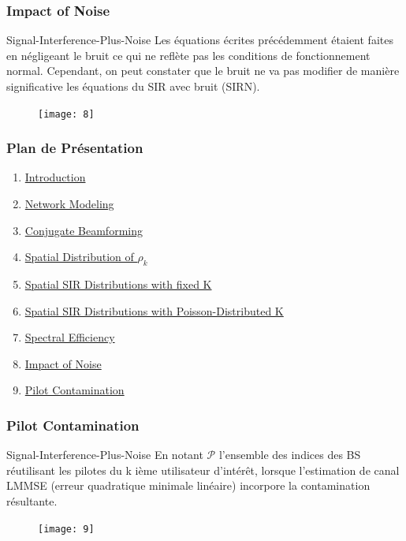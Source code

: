 \documentclass[pdf]{beamer}
\begin{document}
\begin{frame}[label=impactOfNoise]
\frametitle{Impact of Noise}
\begin{exampleblock}{Signal-Interference-Plus-Noise}
Les équations écrites précédemment étaient faites en négligeant le bruit ce qui ne reflète pas les conditions de fonctionnement normal. Cependant, on peut constater que le bruit ne va pas modifier de manière significative les équations du SIR avec bruit (SIRN).
\begin{figure}
	\texttt{[image: 8]}
\end{figure}
\end{exampleblock}
\end{frame}

\begin{frame}
\frametitle{Plan de Présentation }
\begin{enumerate}
	\item \hyperlink{Introduction}{Introduction}
	\item \hyperlink{networkModeling}{Network Modeling}
	\item \hyperlink{conjugateBeamforming}{Conjugate Beamforming}
	\item \hyperlink{spatialDistribution}{Spatial Distribution of $\rho_k$}
	\item \hyperlink{spatialsir}{Spatial SIR Distributions with fixed K}
	\item \hyperlink{spatialsirk}{Spatial SIR Distributions with Poisson-Distributed K}
	\item \hyperlink{spectralEfficiency}{Spectral Efficiency}
	\item \hyperlink{impactOfNoise}{Impact of Noise}
	\item \hyperlink{piloteContamination}{Pilot Contamination}
\end{enumerate}
\end{frame}

\begin{frame}[label=piloteContamination]
\frametitle{Pilot Contamination}
\begin{exampleblock}{Signal-Interference-Plus-Noise}
En notant $\mathcal{P}$ l'ensemble des indices des BS réutilisant les pilotes du k ième utilisateur d'intérêt, lorsque l'estimation de canal LMMSE (erreur quadratique minimale linéaire) incorpore la contamination résultante.
\begin{figure}
	\texttt{[image: 9]}
\end{figure}
\end{exampleblock}
\end{frame}
\end{document}
